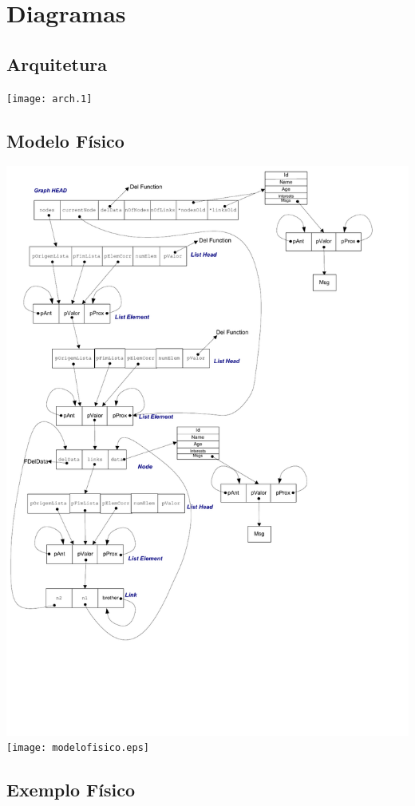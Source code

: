 \documentclass[a4paper,8pt]{article}
\begin{document}
\section{Diagramas}
\subsection{Arquitetura}

\texttt{[image: arch.1]}


\subsection{Modelo Físico}

\ifpdf
\includegraphics[width=\linewidth]{modelofisico.pdf}
\else
\texttt{[image: modelofisico.eps]}
\fi

\pagebreak
\subsection{Exemplo Físico}
\end{document}
